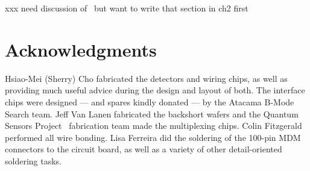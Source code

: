 xxx need discussion of \NETD\, but want to write that section in ch2 first

\section{Acknowledgments}

Hsiao-Mei (Sherry) Cho fabricated the detectors and wiring chips, as well as providing much useful advice during the design and layout of both.
The interface chips were designed --- and spares kindly donated --- by the Atacama B-Mode Search team.
Jeff Van Lanen fabricated the backshort wafers and the Quantum Sensors Project \SQUID\ fabrication team made the multiplexing chips.
Colin Fitzgerald performed all wire bonding.
Lisa Ferreira did the soldering of the 100-pin MDM connectors to the circuit board, as well as a variety of other detail-oriented soldering tasks.
